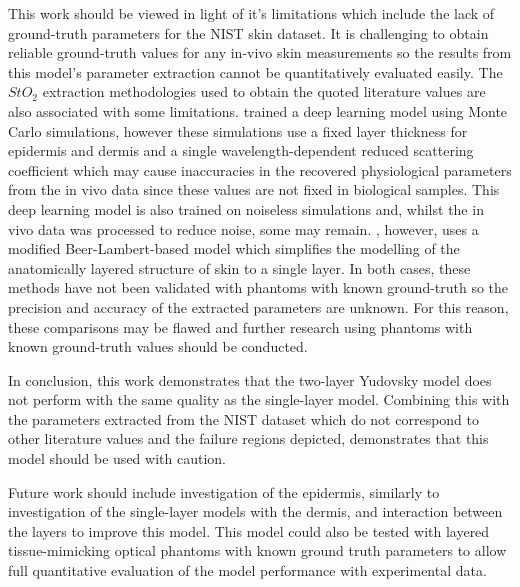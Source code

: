 This work should be viewed in light of it's limitations which include the lack of ground-truth parameters for the NIST skin dataset. It is challenging to obtain reliable ground-truth values for any in-vivo skin measurements so the results from this model's parameter extraction cannot be quantitatively evaluated easily. The $StO_2$ extraction methodologies used to obtain the quoted literature values are also associated with some limitations.  trained a deep learning model using Monte Carlo simulations, however these simulations use a fixed layer thickness for epidermis and dermis and a single wavelength-dependent reduced scattering coefficient which may cause inaccuracies in the recovered physiological parameters from the in vivo data since these values are not fixed in biological samples. This deep learning model is also trained on noiseless simulations and, whilst the in vivo data was processed to reduce noise, some may remain. , however, uses a modified Beer-Lambert-based model which simplifies the modelling of the anatomically layered structure of skin to a single layer. In both cases, these methods have not been validated with phantoms with known ground-truth so the precision and accuracy of the extracted parameters are unknown. For this reason, these comparisons may be flawed and further research using phantoms with known ground-truth values should be conducted.

In conclusion, this work demonstrates that the two-layer Yudovsky model does not perform with the same quality as the single-layer model. Combining this with the parameters extracted from the NIST dataset which do not correspond to other literature values and the failure regions depicted, demonstrates that this model should be used with caution. 

Future work should include investigation of the epidermis, similarly to investigation of the single-layer models with the dermis, and interaction between the layers to improve this model. This model could also be tested with layered tissue-mimicking optical phantoms with known ground truth parameters to allow full quantitative evaluation of the model performance with experimental data. 

